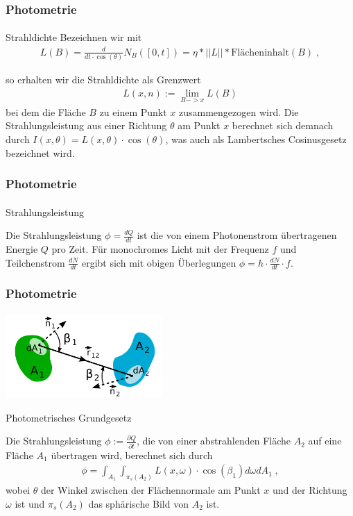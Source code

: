 \documentclass{beamer}
\begin{document}
\begin{frame}
    \frametitle{Photometrie}
\framesubtitle{}

\begin{block}{Strahldichte}
Bezeichnen wir mit 
\begin{align*}
L(B) = \frac{d}{dt \cdot \cos(\theta)}N_B([0,t]) = \eta * ||L||  *  \text{Flächeninhalt} (B) \; , 
 \end{align*}

so erhalten wir die   Strahldichte als Grenzwert
\begin{align*}
L(x, n):= \lim_{B -> x} L(B)
 \end{align*}
bei dem die Fläche $B$  zu einem Punkt $x$ zusammengezogen wird.  Die Strahlungsleistung aus einer Richtung $\theta$  am Punkt $x$ berechnet sich demnach durch $I(x, \theta) = L(x, \theta) \cdot \cos(\theta)$, was auch als Lambertsches Cosinusgesetz bezeichnet wird.
\end{block}
\end{frame}
 

\begin{frame}
    \frametitle{Photometrie}
\framesubtitle{}
\begin{block}{Strahlungsleistung}

Die Strahlungsleistung $\phi = \frac{d Q}{dt}$ ist die von einem Photonenstrom übertragenen Energie $Q$ pro Zeit. 
Für monochromes Licht mit der Frequenz $f$ und Teilchenstrom $ \frac{d N}{dt} $ ergibt sich mit obigen Überlegungen $\phi = h \cdot  \frac{d N}{dt}  \cdot f$.
\end{block}
\end{frame}




\begin{frame}
    \frametitle{Photometrie}
\framesubtitle{}
  \begin{center}

    \includegraphics[width=0.45\textwidth]{images/Fotometrisches_Grundgesetz_Schema.png}
\end{center}


\begin{block}{Photometrisches Grundgesetz}

Die Strahlungsleistung $\phi:= \frac{ \partial Q}{\partial t}$, die von einer abstrahlenden Fläche $A_2$  auf eine Fläche $A_1$ übertragen wird, berechnet sich durch
\begin{align}
\phi = \int_{A_1} \int_{\pi_s(A_2)} L(x, \omega)\cdot \cos(\beta_1) d\omega  dA_1   \; ,
\end{align}
wobei $\theta$ der Winkel zwischen der Flächennormale am Punkt $x$ und der Richtung $\omega$ ist und $\pi_s(A_2)$ das sphärische Bild von $A_2$ ist.
\end{block}
\end{frame}
\end{document}
